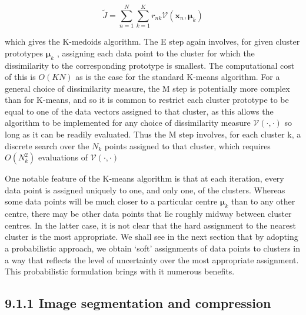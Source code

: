 \documentclass[
  10
]{article}
\begin{document}
\[
\widetilde {J} = \sum_ {n = 1} ^ {N} \sum_ {k = 1} ^ {K} r _ {n k} \mathcal {V} (\mathbf {x} _ {n}, \pmb {\mu} _ {k})\tag{9.6}
\]

which gives the K-medoids algorithm. The E step again involves, for
given cluster prototypes \(\pmb { \mu } _ { k }\) , assigning each data
point to the cluster for which the dissimilarity to the corresponding
prototype is smallest. The computational cost of this is \(O ( K N )\)
as is the case for the standard K-means algorithm. For a general choice
of dissimilarity measure, the M step is potentially more complex than
for K-means, and so it is common to restrict each cluster prototype to
be equal to one of the data vectors assigned to that cluster, as this
allows the algorithm to be implemented for any choice of dissimilarity
measure \(\mathcal { V } ( \cdot , \cdot )\) so long as it can be
readily evaluated. Thus the M step involves, for each cluster k, a
discrete search over the \(N _ { k }\) points assigned to that cluster,
which requires \(O ( N _ { k } ^ { 2 } )\) evaluations of
\(\mathcal { V } ( \cdot , \cdot )\)

One notable feature of the K-means algorithm is that at each iteration,
every data point is assigned uniquely to one, and only one, of the
clusters. Whereas some data points will be much closer to a particular
centre \(\pmb { \mu } _ { k }\) than to any other centre, there may be
other data points that lie roughly midway between cluster centres. In
the latter case, it is not clear that the hard assignment to the nearest
cluster is the most appropriate. We shall see in the next section that
by adopting a probabilistic approach, we obtain `soft' assignments of
data points to clusters in a way that reflects the level of uncertainty
over the most appropriate assignment. This probabilistic formulation
brings with it numerous benefits.

\subsection{9.1.1 Image segmentation and
compression}\label{image-segmentation-and-compression}
\end{document}
